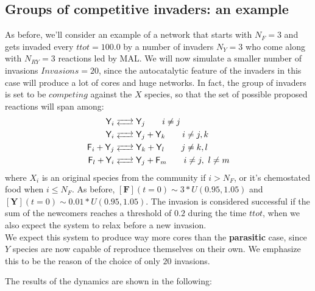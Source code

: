 \documentclass{article}
\begin{document}
\subsection{Groups of competitive invaders: an example}

As before, we'll consider an example of a network that starts with $N_F=3$ and gets invaded every $ttot = 100.0$ by a number of invaders $N_Y = 3$ who come along with $N_{RY} = 3$ reactions led by MAL. We will now simulate a smaller number of invasions $Invasions = 20$, since the autocatalytic feature of the invaders in this case will produce a lot of cores and huge networks. In fact, the group of invaders is set to be $competing$ against the $X$ species, so that the set of possible proposed reactions will span among:
\begin{equation}
		\begin{split}
\ce{\textsf{Y}_i & <--> \textsf{Y}_j } \quad \quad i \neq j \\ 
\ce{\textsf{Y}_i & <--> \textsf{Y}_j + \textsf{Y}_k } \quad \quad i \neq j,k \\
\ce{\textsf{F}_i + \textsf{Y}_j & <--> \textsf{Y}_k + \textsf{Y}_l } \quad \quad j \neq k,l \\ 
\ce{\textsf{F}_l + \textsf{Y}_i & <--> \textsf{Y}_j + \textsf{F}_m } \quad \quad i \neq j , \ l \neq m\\ 
\end{split} 
\end{equation}
where $X_i$ is an original species from the community if $i>N_F$, or it's chemostated food when $i \le N_F$. As before, $\left[\mathbf{F}\right](t=0) \sim 3*U(0.95,1.05)$ and  $\left[\mathbf{Y}\right](t=0) \sim 0.01*U(0.95,1.05)$. The invasion is considered successful if the sum of the newcomers reaches a threshold of $0.2$ during the time $ttot$, when we also expect the system to relax before a new invasion. \\

We expect this system to produce way more cores than the \textbf{parasitic} case, since $Y$ species are now capable of reproduce themselves on their own. We emphasize this to be the reason of the choice of only $20$ invasions.


The results of the dynamics are shown in the following:
\end{document}
